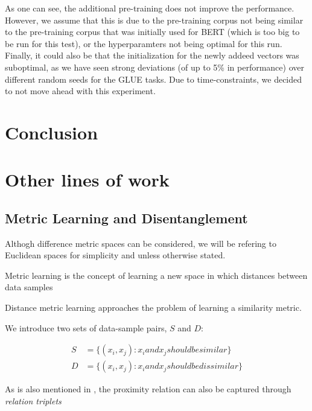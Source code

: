 \documentclass[a4paper,12pt,twoside,openright]{report}
\begin{document}
As one can see, the additional pre-training does not improve the performance.
However, we assume that this is due to the pre-training corpus not being similar to the pre-training corpus that was initially used for BERT (which is too big to be run for this test), or the hyperparamters not being optimal for this run.
Finally, it could also be that the initialization for the newly addeed vectors was suboptimal, as we have seen strong deviations (of up to 5\% in performance) over different random seeds for the GLUE tasks.
Due to time-constraints, we decided to not move ahead with this experiment.

\chapter{Conclusion}

\appendix
\singlespacing

%  

 

\chapter{Other lines of work}

\section{Metric Learning and Disentanglement}

Althogh difference metric spaces can be considered, we will be refering to Euclidean spaces for simplicity and unless otherwise stated.

Metric learning is the concept of learning a new space in which distances between data samples 

Distance metric learning approaches the problem of learning a similarity metric.

We introduce two sets of data-sample pairs, $S$ and $D$:

\begin{align}
S &= \{ (x_i, x_j) : x_i and x_j should be similar\} \\
D &= \{ (x_i, x_j) : x_i and x_j should be dissimilar\}
\end{align}

As is also mentioned in \cite{moutafis17}, the proximity relation can also be captured through \textit{relation triplets}
\end{document}
